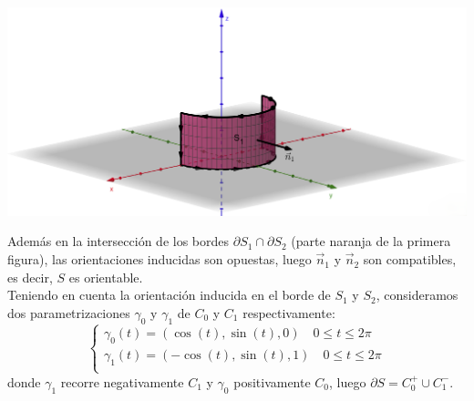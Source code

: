 {\begin{center}
\begin{minipage}{0.48\textwidth}
        \end{minipage}
        \hfill
        \begin{minipage}{0.48\textwidth}
            \centering
            \includegraphics[width=\linewidth]{images/half2.png}
        \end{minipage}
    \end{center}
    Además en la intersección de los bordes $\partial S_1 \cap \partial S_2$ (parte naranja de la primera figura), las orientaciones inducidas son opuestas, luego $\vec{n}_1$ y $\vec{n}_2$ son compatibles, es decir, $S$ es orientable.\\
    Teniendo en cuenta la orientación inducida en el borde de $S_1$ y $S_2$, consideramos dos parametrizaciones $\gamma_0$ y $\gamma_1$ de $C_0$ y $C_1$ respectivamente:
    $$
        \begin{cases}
            \gamma_0(t) = (\cos(t), \sin(t), 0) \quad 0 \leq t \leq 2\pi  \\
            \gamma_1(t) = (-\cos(t), \sin(t), 1) \quad 0 \leq t \leq 2\pi \\
        \end{cases}
    $$
    donde $\gamma_1$ recorre negativamente $C_1$ y $\gamma_0$ positivamente $C_0$, luego $\partial S = C_0^+ \cup C_1^-$.

}

